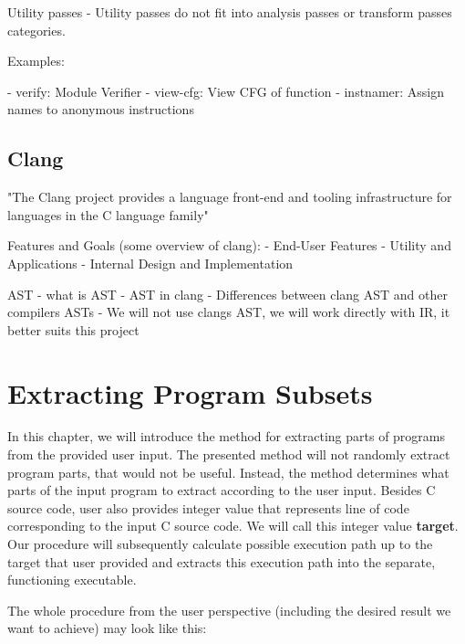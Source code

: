 \documentclass[12pt, twoside]{fithesis2}
\renewcommand{\_}{\leavevmode \kern0.07em\vbox{\hrule width0.4em}}
\begin{document}
Utility passes
- Utility passes do not fit into analysis passes or transform passes categories.

Examples:

- verify: Module Verifier
- view-cfg: View CFG of function
- instnamer: Assign names to anonymous instructions

\section{Clang}
\label{sec:llvm-clang}

"The Clang project provides a language front-end and tooling infrastructure for
languages in the C language family"

Features and Goals (some overview of clang):
- End-User Features
- Utility and Applications
- Internal Design and Implementation

AST
- what is AST
- AST in clang
- Differences between clang AST and other compilers ASTs
- We will not use clangs AST, we will work directly with IR, it better suits
this project


\chapter{Extracting Program Subsets}
\label{chap:design}


In this chapter, we will introduce the method for extracting parts of programs
from the provided user input. The presented method will not randomly extract
program parts, that would not be useful. Instead, the method determines what
parts of the input program to extract according to the user input. Besides C
source code, user also provides integer value that represents line of code
corresponding to the input C source code. We will call this integer value
\textbf{target}.  Our procedure will subsequently calculate possible execution
path up to the target that user provided and extracts this execution path into
the separate, functioning executable.

The whole procedure from the user perspective (including the desired result we
want to achieve) may look like this:
\end{document}
